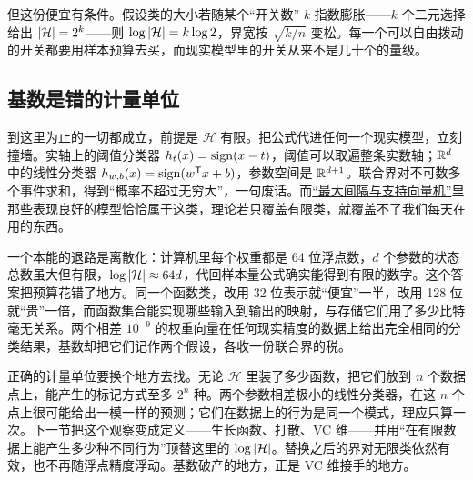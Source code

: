但这份便宜有条件。假设类的大小若随某个``开关数'' \(k\) 指数膨胀——\(k\) 个二元选择给出 \(\left|\mathcal{H}\right| = 2^k\)——则 \(\log\left|\mathcal{H}\right| = k\log 2\)，界宽按 \(\sqrt{k/n}\) 变松。每一个可以自由拨动的开关都要用样本预算去买，而现实模型里的开关从来不是几十个的量级。

\subsection{基数是错的计量单位}

到这里为止的一切都成立，前提是 \(\mathcal{H}\) 有限。把公式代进任何一个现实模型，立刻撞墙。实轴上的阈值分类器 \(h_t(x) = \operatorname{sign}(x - t)\)，阈值可以取遍整条实数轴；\(\mathbb{R}^d\) 中的线性分类器 \(h_{w,b}(x) = \operatorname{sign}(w^{\mathsf{T}}x + b)\)，参数空间是 \(\mathbb{R}^{d+1}\)。联合界对不可数多个事件求和，得到``概率不超过无穷大''，一句废话。而\hyperref[sec:09-Convex-Optimization/07-Applications/03]{``最大间隔与支持向量机''}里那些表现良好的模型恰恰属于这类，理论若只覆盖有限类，就覆盖不了我们每天在用的东西。

一个本能的退路是离散化：计算机里每个权重都是 64 位浮点数，\(d\) 个参数的状态总数虽大但有限，\(\log\left|\mathcal{H}\right| \approx 64d\)，代回样本量公式确实能得到有限的数字。这个答案把预算花错了地方。同一个函数类，改用 32 位表示就``便宜''一半，改用 128 位就``贵''一倍，而函数集合能实现哪些输入到输出的映射，与存储它们用了多少比特毫无关系。两个相差 \(10^{-9}\) 的权重向量在任何现实精度的数据上给出完全相同的分类结果，基数却把它们记作两个假设，各收一份联合界的税。

正确的计量单位要换个地方去找。无论 \(\mathcal{H}\) 里装了多少函数，把它们放到 \(n\) 个数据点上，能产生的标记方式至多 \(2^n\) 种。两个参数相差极小的线性分类器，在这 \(n\) 个点上很可能给出一模一样的预测；它们在数据上的行为是同一个模式，理应只算一次。下一节把这个观察变成定义——生长函数、打散、VC 维——并用``在有限数据上能产生多少种不同行为''顶替这里的 \(\log\left|\mathcal{H}\right|\)。替换之后的界对无限类依然有效，也不再随浮点精度浮动。基数破产的地方，正是 VC 维接手的地方。

